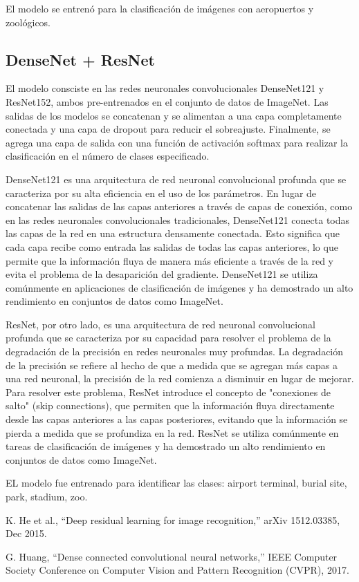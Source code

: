 \documentclass[article]{llncs}
\begin{document}
El modelo se entren\'o para la clasificación de im\'agenes con aeropuertos y zool\'ogicos.


\subsection{DenseNet + ResNet}

El modelo consciste en las redes neuronales convolucionales DenseNet121 y ResNet152, ambos pre-entrenados en el conjunto 
de datos de ImageNet. Las salidas de los modelos se concatenan y se alimentan a una capa completamente conectada y una 
capa de dropout para reducir el sobreajuste. Finalmente, se agrega una capa de salida con una función de activación 
softmax para realizar la clasificación en el número de clases especificado.  

DenseNet121 es una arquitectura de red neuronal convolucional profunda que se caracteriza por su alta eficiencia en el 
uso de los parámetros. En lugar de concatenar las salidas de las capas anteriores a través de capas de conexión, como en 
las redes neuronales convolucionales tradicionales, DenseNet121 conecta todas las capas de la red en una estructura 
densamente conectada. Esto significa que cada capa recibe como entrada las salidas de todas las capas anteriores, lo que 
permite que la información fluya de manera más eficiente a través de la red y evita el problema de la desaparición del 
gradiente. DenseNet121 se utiliza comúnmente en aplicaciones de clasificación de imágenes y ha demostrado un alto 
rendimiento en conjuntos de datos como ImageNet.

ResNet, por otro lado, es una arquitectura de red neuronal convolucional profunda que se caracteriza por su capacidad 
para resolver el problema de la degradación de la precisión en redes neuronales muy profundas. La degradación de la 
precisión se refiere al hecho de que a medida que se agregan más capas a una red neuronal, la precisión de la red 
comienza a disminuir en lugar de mejorar. Para resolver este problema, ResNet introduce el concepto de "conexiones de 
salto" (skip connections), que permiten que la información fluya directamente desde las capas anteriores a las capas 
posteriores, evitando que la información se pierda a medida que se profundiza en la red. ResNet se utiliza comúnmente en 
tareas de clasificación de imágenes y ha demostrado un alto rendimiento en conjuntos de datos como ImageNet.

EL modelo fue entrenado para identificar las clases: airport terminal, burial site, park, stadium, zoo. 


\begin{thebibliography}{8}
        K. He et al., “Deep residual learning for image recognition,” arXiv 1512.03385, Dec 2015.
  
        G. Huang, “Dense connected convolutional neural networks,” IEEE Computer Society Conference on Computer Vision and Pattern Recognition (CVPR), 2017.
  
  
  \end{thebibliography}
\end{document}

